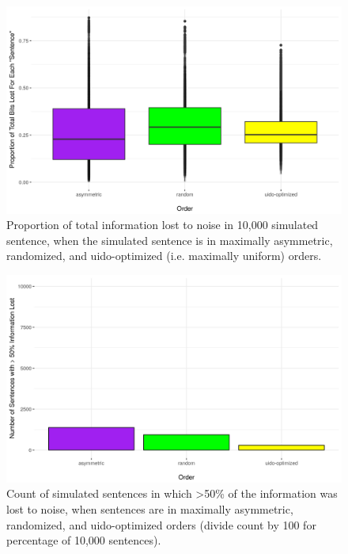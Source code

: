 \documentclass[12pt]{article}
\begin{document}
\begin{figure}
	\begin{center}
\includegraphics[width=.95\textwidth]{uid-sim-totalbits.png}
\caption{Proportion of total information lost to noise in 10,000 simulated sentence, when the simulated sentence is in maximally asymmetric, randomized, and uido-optimized (i.e. maximally uniform) orders.}
\label{simBits}
\end{center}
\end{figure}

\begin{figure}
	\begin{center}
		\includegraphics[width=.95\textwidth]{uid-sim-majority.png}
		\caption{Count of simulated sentences in which >50\% of the information was lost to noise, when sentences are in maximally asymmetric, randomized, and uido-optimized orders (divide count by 100 for percentage of 10,000 sentences).}
		\label{simMaj}
	\end{center}
\end{figure}
\end{document}
